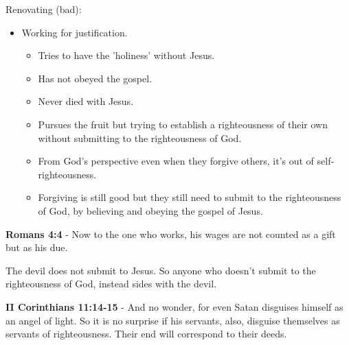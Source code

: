 \documentclass[11pt]{article}
\begin{document}
Renovating (bad):
\begin{itemize}
\item Working for justification.
\begin{itemize}
\item Tries to have the 'holiness' without Jesus.
\item Has not obeyed the gospel.
\item Never died with Jesus.
\item Pursues the fruit but trying to establish a righteousness of their own without submitting to the righteousness of God.
\item From God's perspective even when they forgive others, it's out of self-righteousness.
\item Forgiving is still good but they still need to submit to the righteousness of God, by believing and obeying the gospel of Jesus.
\end{itemize}
\end{itemize}

\textbf{Romans 4:4} - Now to the one who works, his wages are not counted as a gift but as his due.

The devil does not submit to Jesus. So anyone who doesn't submit to the righteousness of God, instead sides with the devil.

\textbf{II Corinthians 11:14-15} - And no wonder, for even Satan disguises himself as an angel of light. So it is no surprise if his servants, also, disguise themselves as servants of righteousness. Their end will correspond to their deeds.
\end{document}
